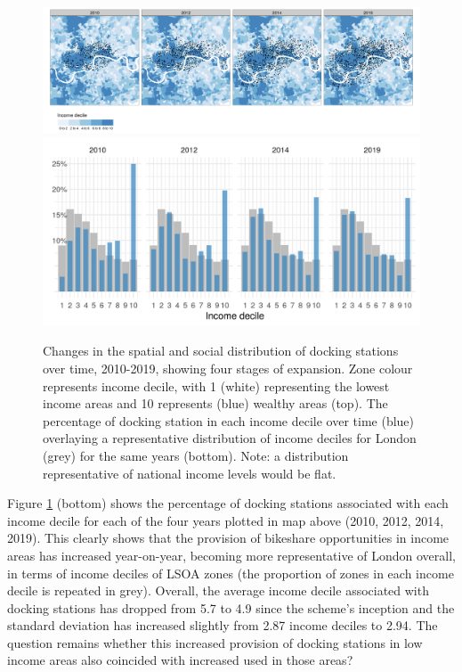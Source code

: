 \documentclass[
]{article}
\begin{document}
\begin{figure}

\includegraphics[width=1\linewidth]{figures/facet-imd} \includegraphics[width=1\linewidth]{figures/stations-imd-facet-4-grey} \hfill{}

\caption{Changes in the spatial and social distribution of docking stations over time, 2010-2019, showing four stages of expansion. Zone colour represents income decile, with 1 (white) representing the lowest income areas and 10 represents (blue) wealthy areas (top). The percentage of docking station in each income decile over time (blue) overlaying a representative distribution of income deciles for London (grey) for the same years (bottom). Note: a distribution representative of national income levels would be flat.}\label{fig:facet-map}
\end{figure}

Figure \ref{fig:facet-map} (bottom) shows the percentage of docking stations associated with each income decile for each of the four years plotted in map above (2010, 2012, 2014, 2019).
This clearly shows that the provision of bikeshare opportunities in income areas has increased year-on-year, becoming more representative of London overall, in terms of income deciles of LSOA zones (the proportion of zones in each income decile is repeated in grey).
Overall, the average income decile associated with docking stations has dropped from 5.7 to 4.9 since the scheme's inception and the standard deviation has increased slightly from 2.87 income deciles to 2.94.
The question remains whether this increased provision of docking stations in low income areas also coincided with increased used in those areas?
\end{document}
